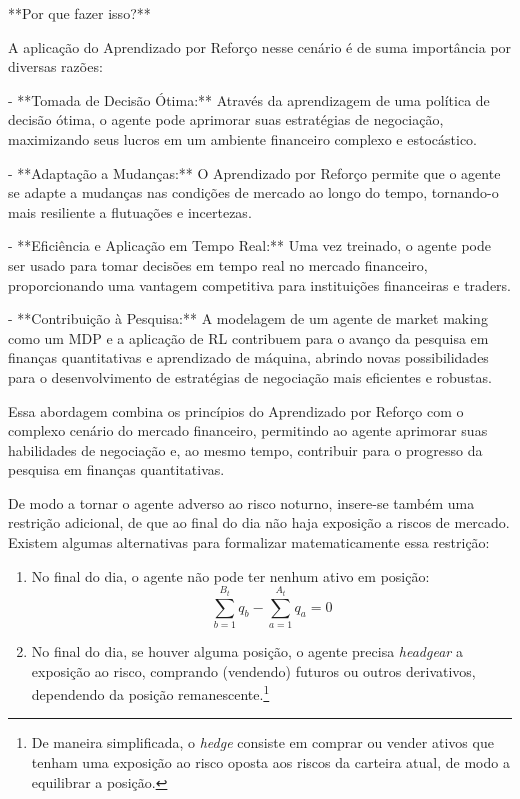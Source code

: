 **Por que fazer isso?**

A aplicação do Aprendizado por Reforço nesse cenário é de suma importância por diversas razões:

- **Tomada de Decisão Ótima:** Através da aprendizagem de uma política de decisão ótima, o agente pode aprimorar suas estratégias de negociação, maximizando seus lucros em um ambiente financeiro complexo e estocástico.

- **Adaptação a Mudanças:** O Aprendizado por Reforço permite que o agente se adapte a mudanças nas condições de mercado ao longo do tempo, tornando-o mais resiliente a flutuações e incertezas.

- **Eficiência e Aplicação em Tempo Real:** Uma vez treinado, o agente pode ser usado para tomar decisões em tempo real no mercado financeiro, proporcionando uma vantagem competitiva para instituições financeiras e traders.

- **Contribuição à Pesquisa:** A modelagem de um agente de market making como um MDP e a aplicação de RL contribuem para o avanço da pesquisa em finanças quantitativas e aprendizado de máquina, abrindo novas possibilidades para o desenvolvimento de estratégias de negociação mais eficientes e robustas.

Essa abordagem combina os princípios do Aprendizado por Reforço com o complexo cenário do mercado financeiro, permitindo ao agente aprimorar suas habilidades de negociação e, ao mesmo tempo, contribuir para o progresso da pesquisa em finanças quantitativas.

De modo a tornar o agente adverso ao risco noturno, insere-se também uma restrição adicional, de que ao final do dia não haja exposição a riscos de mercado. 
Existem algumas alternativas para formalizar matematicamente essa restrição:
\begin{enumerate}
    \item No final do dia, o agente não pode ter nenhum ativo em posição: 
    \begin{equation}
        \sum_{b=1}^{B_t} q_b  - \sum_{a=1}^{A_t} q_a = 0\label{eq:eod_restriction}
    \end{equation}
    \item No final do dia, se houver alguma posição, o agente precisa \textit{headgear} a exposição ao risco, comprando (vendendo) futuros ou outros derivativos, dependendo da posição remanescente.\footnote{De maneira simplificada, o \textit{hedge} consiste em comprar ou vender ativos que tenham uma exposição ao risco oposta aos riscos da carteira atual, de modo a equilibrar a posição.}
\end{enumerate}
